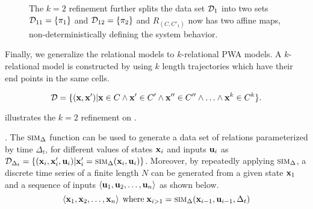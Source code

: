 \begin{figure}[!htbp]
\begin{center}
\begin{tikzpicture}
\end{tikzpicture}
\end{center}
\vspace*{-.3cm}
\caption{The $k=2$ refinement further splits the data set $\ds_1$
    into two sets $\ds_{11} = \setof{\pi_1}$ and $\ds_{12} =
    \setof{\pi_2}$ and $R_{(C,C'_1)}$ now has two affine maps,
    non-deterministically defining the system behavior.}
\label{fig:k2}
\vspace*{-.3cm}
\end{figure}


Finally, we generalize the relational models to $k$-relational PWA
models. A $k$-relational model is constructed by using $k$ length
trajectories which have their end points in the same cells.

\[
    \ds = \setof{(\vx,\vx') | \vx \in C \land \vx' \in C' \land \vx''
    \in C'' \land \ldots \land \vx^k \in C^k }.
\]





 illustrates the $k=2$ refinement on .

.
The $\simulate$ function can be used to generate a data set of
relations parameterized by time $\Delta_t$, for different values of
states $\x_i$ and inputs $\vu_i$ as $\ds_{\Delta_t} =
\setof{(\x_i,\x'_i,\vu_i) | \x'_i = \simulate(\x_i,\vu_i)}$.
Moreover, by repeatedly applying $\simulate$, a discrete time series
of a finite length $N$ can be generated from a given state $\x_1$
and a sequence of inputs $\tupleof{\vu_1, \vu_2,\ldots,\vu_n}$ as shown
below.
\[\tupleof{\x_1, \x_2, \ldots, \x_n} \;\text{where}\; \x_{i>1} =
\simulate(\x_{i-1}, \vu_{i-1}, \Delta_t)\]

